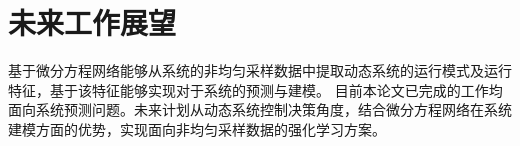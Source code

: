 \section{未来工作展望}
基于微分方程网络能够从系统的非均匀采样数据中提取动态系统的运行模式及运行特征，基于该特征能够实现对于系统的预测与建模。
目前本论文已完成的工作均面向系统预测问题。未来计划从动态系统控制决策角度，结合微分方程网络在系统建模方面的优势，实现面向非均匀采样数据的强化学习方案。









